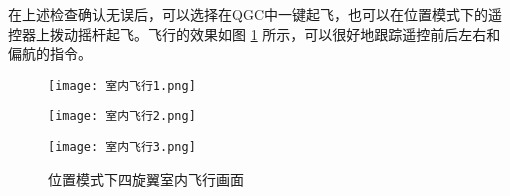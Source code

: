 \newpage

在上述检查确认无误后，可以选择在QGC中一键起飞，也可以在位置模式下的遥控器上拨动摇杆起飞。飞行的效果如图 \ref{室内飞行} 所示，可以很好地跟踪遥控前后左右和偏航的指令。

\begin{figure}[h]
  \centering
  \begin{minipage}[c]{0.33\textwidth}
    \centering
    \texttt{[image: 室内飞行1.png]}
  \end{minipage} \hfill
  \begin{minipage}[c]{0.33\textwidth}
    \centering
    \texttt{[image: 室内飞行2.png]}
  \end{minipage}\hfill
    \begin{minipage}[c]{0.33\textwidth}
      \centering
      \texttt{[image: 室内飞行3.png]}
  \end{minipage}
  \caption{位置模式下四旋翼室内飞行画面}
  \label{室内飞行}
  \end{figure}